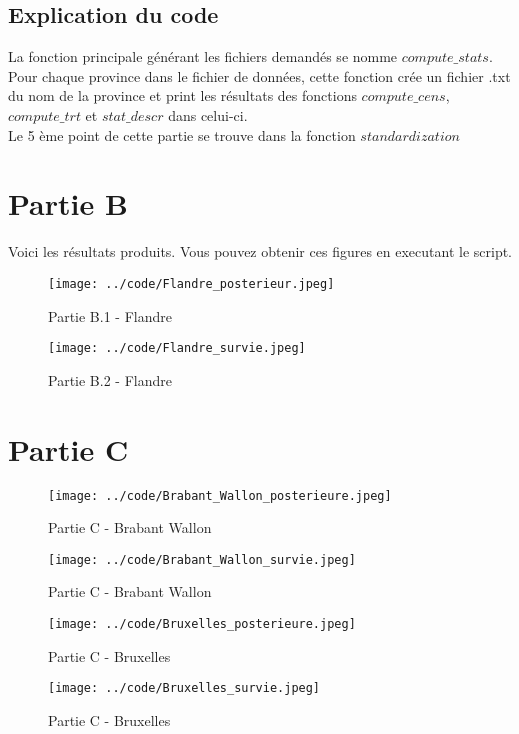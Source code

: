 \documentclass{article}
\begin{document}
\subsection{Explication du code}

La fonction principale générant les fichiers demandés se nomme $compute\_stats$. Pour chaque province dans le fichier de données, cette fonction crée un fichier .txt du nom de la province et print les résultats des fonctions $compute\_cens$, $compute\_trt$ et $stat\_descr$ dans celui-ci. \\
Le 5 ème point de cette partie se trouve dans la fonction $standardization$

\section{Partie B}
Voici les résultats produits. Vous pouvez obtenir ces figures en executant le script.


\begin{figure}[!h]
   \begin{minipage}[c]{.46\linewidth}
	\texttt{[image: ../code/Flandre\_posterieur.jpeg]}
	\caption{Partie B.1 - Flandre}
   \end{minipage} \hfill
   \begin{minipage}[c]{.46\linewidth}
	\texttt{[image: ../code/Flandre\_survie.jpeg]}
	\caption{Partie B.2 - Flandre}
   \end{minipage}
\end{figure}

\section{Partie C}
\begin{figure}[!h]
   \begin{minipage}[c]{.46\linewidth}
	\texttt{[image: ../code/Brabant\_Wallon\_posterieure.jpeg]}
	\caption{Partie C - Brabant Wallon}
   \end{minipage} \hfill
   \begin{minipage}[c]{.46\linewidth}
	\texttt{[image: ../code/Brabant\_Wallon\_survie.jpeg]}
	\caption{Partie C - Brabant Wallon }
   \end{minipage}
\end{figure}

\begin{figure}[!h]
   \begin{minipage}[c]{.46\linewidth}
	\texttt{[image: ../code/Bruxelles\_posterieure.jpeg]}
	\caption{Partie C - Bruxelles}
   \end{minipage} \hfill
   \begin{minipage}[c]{.46\linewidth}
	\texttt{[image: ../code/Bruxelles\_survie.jpeg]}
	\caption{Partie C - Bruxelles}
   \end{minipage}
\end{figure}
\end{document}
